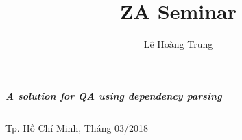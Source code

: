 \documentclass{beamer}
\title[]{ZA Seminar}
\author[]{Lê Hoàng Trung} %
\institute[HCMUS] %
{
	\textit{le.hg.trung@gmail.com} %
}
\date[\today]{} %
\begin{document}
\begin{frame}[plain]
	\maketitle
	\small
	{\centering\itshape \huge{\bf{A solution for QA using dependency parsing}} \par}
	\footnotesize
	\begin{table}[c]
		\centering 
		\begin{tabular}{rrl}
							
		\end{tabular}
	\end{table}
	\begin{center}
		{\footnotesize Tp. Hồ Chí Minh, Tháng 03/2018}
	\end{center}
\end{frame}
	
	
\end{document}
